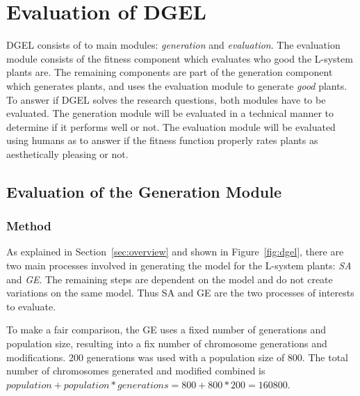 \chapter{Evaluation of DGEL}
DGEL consists of to main modules: \textit{generation} and \textit{evaluation}.
The evaluation module consists of the fitness component which evaluates who good the L-system plants are.
The remaining components are part of the generation component which generates plants, and uses the evaluation module to generate \textit{good} plants.
To answer if DGEL solves the research questions, both modules have to be evaluated.
The generation module will be evaluated in a technical manner to determine if it performs well or not.
The evaluation module will be evaluated using humans as to answer if the fitness function properly rates plants as aesthetically pleasing or not.

\section{Evaluation of the Generation Module}
\subsection{Method}
As explained in Section~\ref{sec:overview} and shown in Figure~\ref{fig:dgel}, there are two main processes involved in generating the model for the L-system plants: \textit{SA} and \textit{GE}.
The remaining steps are dependent on the model and do not create variations on the same model.
Thus SA and GE are the two processes of interests to evaluate.


To make a fair comparison, the
GE uses a fixed number of generations and population size, resulting into a fix number of chromosome generations and modifications.
200 generations was used with a population size of 800.
The total number of chromosomes generated and modified combined is $population + population * generations = 800 + 800 * 200 = 160800$.

